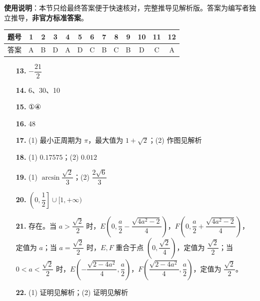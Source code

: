 
\begin{gknotice}
\textbf{使用说明}：本节只给最终答案便于快速核对，完整推导见解析版。答案为编写者独立推导，\textbf{非官方标准答案}。
\end{gknotice}

\begin{center}\begin{tabular}{ccccccccccccc}
\toprule
题号 & 1 & 2 & 3 & 4 & 5 & 6 & 7 & 8 & 9 & 10 & 11 & 12 \\
\midrule
答案 & A & B & D & A & D & C & B & C & B & D & C & A \\
\bottomrule
\end{tabular}\end{center}

\begin{itemize}[leftmargin=2.6em]
  \item[\textbf{13.}] $-\dfrac{21}{2}$
  \item[\textbf{14.}] 6、30、10
  \item[\textbf{15.}] ①④
  \item[\textbf{16.}] 48
\end{itemize}

\begin{itemize}[leftmargin=2.6em]
  \item[\textbf{17.}] (1) 最小正周期为 $\pi$，最大值为 $1 + \sqrt{2}$；(2) 作图见解析
  \item[\textbf{18.}] (1) $0.17575$；(2) $0.012$
  \item[\textbf{19.}] (1) $\arcsin\dfrac{\sqrt{2}}{3}$；(2) $\dfrac{2\sqrt{6}}{3}$
  \item[\textbf{20.}] $\left(0, \dfrac{1}{2}\right] \cup [1, +\infty)$
  \item[\textbf{21.}] 存在。当 $a > \dfrac{\sqrt{2}}{2}$ 时，$E\left(0, \dfrac{a}{2} - \dfrac{\sqrt{4a^2 - 2}}{4}\right)$，$F\left(0, \dfrac{a}{2} + \dfrac{\sqrt{4a^2 - 2}}{4}\right)$，定值为 $a$；当 $a = \dfrac{\sqrt{2}}{2}$ 时，$E, F$ 重合于点 $\left(0, \dfrac{\sqrt{2}}{4}\right)$，定值为 $\dfrac{\sqrt{2}}{2}$；当 $0 < a < \dfrac{\sqrt{2}}{2}$ 时，$E\left(-\dfrac{\sqrt{2 - 4a^2}}{4}, \dfrac{a}{2}\right)$，$F\left(\dfrac{\sqrt{2 - 4a^2}}{4}, \dfrac{a}{2}\right)$，定值为 $\dfrac{\sqrt{2}}{2}$。
  \item[\textbf{22.}] (1) 证明见解析；(2) 证明见解析
\end{itemize}
